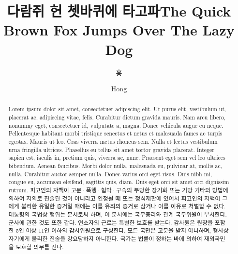 \documentclass[doctor,english,final,pdfdoc]{PKNU-thesis}
\title[korean]{다람쥐 헌 쳇바퀴에 타고파}
\title[english]{The Quick Brown Fox Jumps Over The Lazy Dog}
\author[korean]{홍}{길 동}
\author[english]{Hong}{Gil Dong}
\begin{document}
 

    \makecontents

    \begin{abstract}
        {
            Lorem ipsum dolor sit amet, consectetuer adipiscing elit. Ut purus elit, vestibulum ut,
            placerat ac, adipiscing vitae, felis. Curabitur dictum gravida mauris. Nam arcu libero,
            nonummy eget, consectetuer id, vulputate a, magna. Donec vehicula augue eu neque.
            Pellentesque habitant morbi tristique senectus et netus et malesuada fames ac turpis
            egestas. Mauris ut leo. Cras viverra metus rhoncus sem. Nulla et lectus vestibulum
            urna fringilla ultrices. Phasellus eu tellus sit amet tortor gravida placerat. Integer
            sapien est, iaculis in, pretium quis, viverra ac, nunc. Praesent eget sem vel leo ultrices
            bibendum. Aenean faucibus. Morbi dolor nulla, malesuada eu, pulvinar at, mollis ac,
            nulla. Curabitur auctor semper nulla. Donec varius orci eget risus. Duis nibh mi, congue
            eu, accumsan eleifend, sagittis quis, diam. Duis eget orci sit amet orci dignissim rutrum.
        }
        {
            피고인의 자백이 고문·폭행·협박·구속의 부당한 장기화 또는 기망 기타의 방법에 의하여 자의로 진술된 것이 아니라고 인정될 때 또는 정식재판에 있어서 피고인의 자백이 그에게 불리한 유일한 증거일 때에는 이를 유죄의 증거로 삼거나 이를 이유로 처벌할 수 없다.
            대통령의 국법상 행위는 문서로써 하며, 이 문서에는 국무총리와 관계 국무위원이 부서한다. 
            군사에 관한 것도 또한 같다. 
            연소자의 근로는 특별한 보호를 받는다. 
            감사원은 원장을 포함한 5인 이상 11인 이하의 감사위원으로 구성한다. 
            모든 국민은 고문을 받지 아니하며, 형사상 자기에게 불리한 진술을 강요당하지 아니한다. 
            국가는 법률이 정하는 바에 의하여 재외국민을 보호할 의무를 진다.
        }
    \end{abstract}
\end{document}
